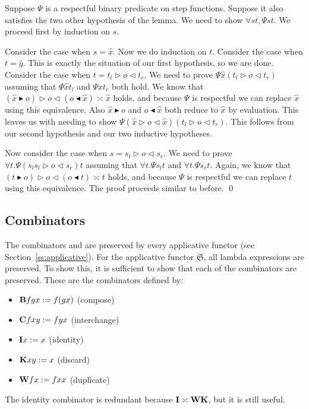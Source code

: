 \documentclass{elsarticle}
\newcommand{\assign}{:=}
\newcommand{\tmstrong}[1]{\textbf{#1}}
\newcommand{\tmtextup}[1]{{\upshape{#1}}}
\newenvironment{proof}{\vspace{1ex}\noindent{\bf Proof}\hspace{0.5em}}
	{\hfill\qed\vspace{1ex}}
\newcommand{\pure}[1]{\ensuremath{\widehat{#1}}}
\newcommand{\SF}{\ensuremath{\mathfrak{S}}}
\newcommand{\comp}{\text{{\tmstrong{\tmtextup{B}}}}}
\newcommand{\flip}{\text{{\tmstrong{\tmtextup{C}}}}}
\newcommand{\id}{\text{{\tmstrong{\tmtextup{I}}}}}
\newcommand{\const}{\text{{\tmstrong{\tmtextup{K}}}}}
\newcommand{\diag}{\text{{\tmstrong{\tmtextup{W}}}}}
\newcommand{\glue}[3]{\ensuremath{#1 \vartriangleright #2 \vartriangleleft #3}}
\newcommand{\splitl}[2]{\ensuremath{#1 \blacktriangleright #2}}
\newcommand{\splitr}[2]{\ensuremath{#2 \blacktriangleleft #1}}
\begin{document}
\begin{proof}
  Suppose $\Psi$ is a respectful binary predicate on step functions. Suppose
  it also satisfies the two other hypothesis of the lemma. We need to show
  $\forall s t, \Psi s t$. We proceed first by induction on $s$.
  
  Consider the case when $s = \pure{x}$. Now we do induction on $t$. Consider
  the case when $t = \pure{y}$. This is exactly the situation of our first
  hypothesis, so we are done. Consider the case when $t = \glue{t_l}{o}{t_r}$.
  We need to prove $\Psi \pure{x} ( \glue{t_l}{o}{t_r})$ assuming that $\Psi
  \pure{x} t_l$ and $\Psi \pure{x} t_r$ both hold. We know that
  $\glue{\splitl{( \pure{x}}{o)}}{o}{\splitr{\pure{x})}{(o} \asymp \pure{x}}$
  holds, and because $\Psi$ is respectful we can replace $\pure{x}$ using this
  equivalence. Also $\splitl{\pure{x}}{o}$ and $\splitr{\pure{x}}{o}$ both
  reduce to $\pure{x}$ by evaluation. This leaves us with needing to show
  $\Psi ( \glue{\pure{x}}{o}{\pure{x}}) ( \glue{t_l}{o}{t_r})$. This follows
  from our second hypothesis and our two inductive hypotheses.
  
  Now consider the case when $s = \glue{s_l}{o}{s_r}$. We need to prove
  $\forall t. \Psi (s_l \glue{s_l}{o}{s_r}) t$ assuming that $\forall t. \Psi
  s_l t$ and $\forall t. \Psi s_r t$. Again, we know that
  $\glue{\splitl{(t}{o)}}{o}{\splitr{t)}{(o} \asymp t}$ holds, and because
  $\Psi$ is respectful we can replace $t$ using this equivalence. The proof
  proceeds similar to before.
\end{proof}

\subsection{Combinators}\label{ss:Combinator}The
combinators {\comp} and {\id} are preserved by every
applicative functor (see Section~\ref{ss:applicative}). For the applicative
functor $\SF$, all lambda expressions are preserved. To show this, it is
sufficient to show that each of the {\comp}{\flip}{\const}{\diag} combinators
are preserved. These are the combinators defined by:
\begin{itemize}
  \item $\comp f g x \assign f (g x)$ (compose)
  \item $\flip f x y \assign f y x$ (interchange)
  \item $\id x \assign x$ (identity)
  \item $\const x y \assign x$ (discard)
  \item $\diag f x \assign f x x$ (duplicate)
\end{itemize}
The identity combinator is redundant because $\id \asymp \diag \const$, but it
is still useful.
\end{document}
